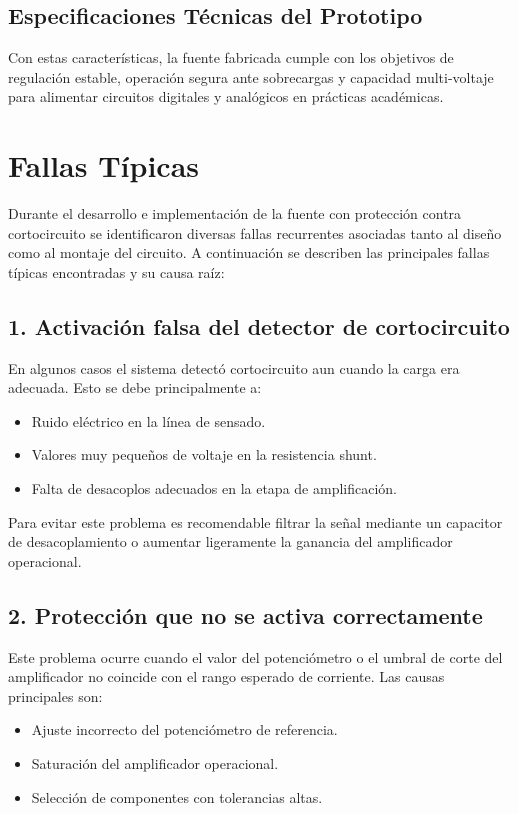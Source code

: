 \documentclass[pdflatex,sn-mathphys-num]{sn-jnl}%
\begin{document}
\vspace{0.4cm}

\subsection*{Especificaciones Técnicas del Prototipo}


Con estas características, la fuente fabricada cumple con los objetivos de regulación estable, operación segura ante sobrecargas y capacidad multi-voltaje para alimentar circuitos digitales y analógicos en prácticas académicas.


\section{Fallas Típicas}

Durante el desarrollo e implementación de la fuente con protección contra cortocircuito se identificaron diversas fallas recurrentes asociadas tanto al diseño como al montaje del circuito. A continuación se describen las principales fallas típicas encontradas y su causa raíz:

\subsection*{1. Activación falsa del detector de cortocircuito}
En algunos casos el sistema detectó cortocircuito aun cuando la carga era adecuada. Esto se debe principalmente a:
\begin{itemize}
    \item Ruido eléctrico en la línea de sensado.
    \item Valores muy pequeños de voltaje en la resistencia shunt.
    \item Falta de desacoplos adecuados en la etapa de amplificación.
\end{itemize}
Para evitar este problema es recomendable filtrar la señal mediante un capacitor de desacoplamiento o aumentar ligeramente la ganancia del amplificador operacional.

\subsection*{2. Protección que no se activa correctamente}
Este problema ocurre cuando el valor del potenciómetro o el umbral de corte del amplificador no coincide con el rango esperado de corriente. Las causas principales son:
\begin{itemize}
    \item Ajuste incorrecto del potenciómetro de referencia.
    \item Saturación del amplificador operacional.
    \item Selección de componentes con tolerancias altas.
\end{itemize}
\end{document}
